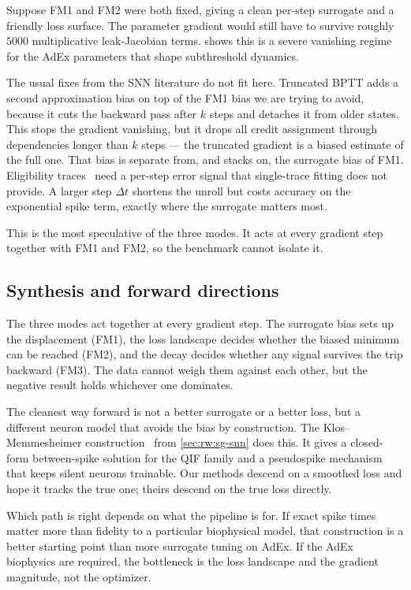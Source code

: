 Suppose FM1 and FM2 were both fixed, giving a clean per-step surrogate and a friendly loss surface.
The parameter gradient would still have to survive roughly $5000$ multiplicative leak-Jacobian terms.
 shows this is a severe vanishing regime for the \gls{AdEx} parameters that shape subthreshold dynamics.

The usual fixes from the \gls{SNN} literature do not fit here.
Truncated \gls{BPTT} adds a second approximation bias on top of the FM1 bias we are trying to avoid, because it cuts the backward pass after $k$ steps and detaches it from older states.
This stops the gradient vanishing, but it drops all credit assignment through dependencies longer than $k$ steps --- the truncated gradient is a biased estimate of the full one.
That bias is separate from, and stacks on, the surrogate bias of FM1.
Eligibility traces~\cite{Bellec2020} need a per-step error signal that single-trace fitting does not provide.
A larger step $\Delta t$ shortens the unroll but costs accuracy on the exponential spike term, exactly where the surrogate matters most.

This is the most speculative of the three modes.
It acts at every gradient step together with FM1 and FM2, so the benchmark cannot isolate it.

\subsection{Synthesis and forward directions}\label{sec:discussion:forward}

The three modes act together at every gradient step.
The surrogate bias sets up the displacement (FM1), the loss landscape decides whether the biased minimum can be reached (FM2), and the decay decides whether any signal survives the trip backward (FM3).
The data cannot weigh them against each other, but the negative result holds whichever one dominates.

The cleanest way forward is not a better surrogate or a better loss, but a different neuron model that avoids the bias by construction.
The Klos--Memmesheimer construction~\cite{Klos2025} from \cref{sec:rw:sg-snn} does this.
It gives a closed-form between-spike solution for the \gls{QIF} family and a pseudospike mechanism that keeps silent neurons trainable.
Our methods descend on a smoothed loss and hope it tracks the true one; theirs descend on the true loss directly.

Which path is right depends on what the pipeline is for.
If exact spike times matter more than fidelity to a particular biophysical model, that construction is a better starting point than more surrogate tuning on \gls{AdEx}.
If the \gls{AdEx} biophysics are required, the bottleneck is the loss landscape and the gradient magnitude, not the optimizer.

